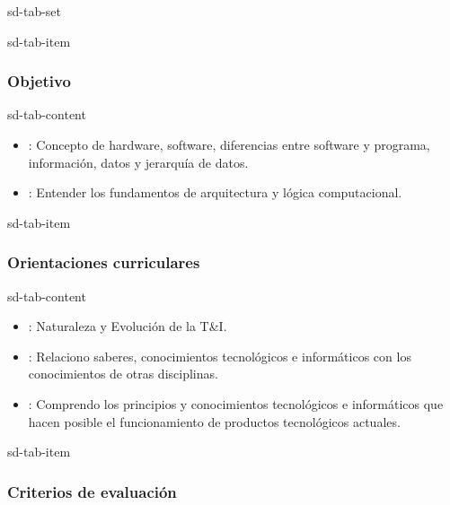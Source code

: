 \documentclass[letterpaper,10pt,spanish]{sphinxmanual}
\begin{document}
\begin{sphinxuseclass}{sd-tab-set}
\begin{sphinxuseclass}{sd-tab-item}\subsubsection*{Objetivo}

\begin{sphinxuseclass}{sd-tab-content}\begin{itemize}
\item {} 
\sphinxAtStartPar
{}: Concepto de hardware, software, diferencias entre software y programa, información, datos y jerarquía de datos.

\item {} 
\sphinxAtStartPar
{}: Entender los fundamentos de arquitectura y lógica computacional.

\end{itemize}

\end{sphinxuseclass}
\end{sphinxuseclass}
\begin{sphinxuseclass}{sd-tab-item}\subsubsection*{Orientaciones curriculares}

\begin{sphinxuseclass}{sd-tab-content}\begin{itemize}
\item {} 
\sphinxAtStartPar
{}: Naturaleza y Evolución de la T\&I.

\item {} 
\sphinxAtStartPar
{}: Relaciono saberes, conocimientos tecnológicos e informáticos con los conocimientos de otras disciplinas.

\item {} 
\sphinxAtStartPar
{}: Comprendo los principios y conocimientos tecnológicos e informáticos que hacen posible el funcionamiento de productos tecnológicos actuales.

\end{itemize}

\end{sphinxuseclass}
\end{sphinxuseclass}
\begin{sphinxuseclass}{sd-tab-item}\subsubsection*{Criterios de evaluación}


\end{sphinxuseclass}
\end{sphinxuseclass}
\end{document}
